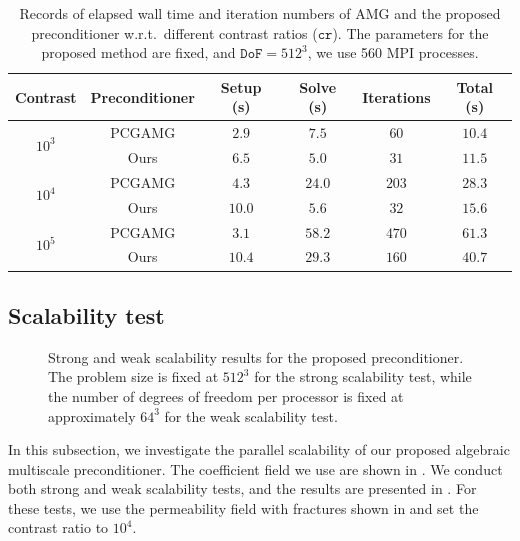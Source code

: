 \documentclass[preprint,12pt]{elsarticle}
\begin{document}
  \begin{table}
    [!ht] \footnotesize
    \caption{Records of elapsed wall time and iteration numbers of AMG and the
    proposed preconditioner w.r.t.\ different contrast ratios ($\mathtt{cr}$).
    The parameters for the proposed method are fixed, and $\mathtt{DoF}=512^{3}$,
    we use 560 MPI processes.}
    \label{tab:comparison_contrast_512}
    \begin{center}
      \makegapedcells
      \begin{tabular}{c c c c c c}
        \toprule Contrast                  & Preconditioner & Setup (s) & Solve (s) & Iterations & Total (s) \\
        \midrule \multirow{2}{*}{$10^{3}$} & PCGAMG         & $2.9$     & $7.5$     & $60$       & $10.4$    \\
                                           & Ours           & $6.5$     & $5.0$     & $31$       & $11.5$    \\
        \midrule \multirow{2}{*}{$10^{4}$} & PCGAMG         & $4.3$     & $24.0$    & $203$      & $28.3$    \\
                                           & Ours           & $10.0$    & $5.6$     & $32$       & $15.6$    \\
        \midrule \multirow{2}{*}{$10^{5}$} & PCGAMG         & $3.1$     & $58.2$    & $470$      & $61.3$    \\
                                           & Ours           & $10.4$    & $29.3$    & $160$      & $40.7$    \\
        \bottomrule
      \end{tabular}
    \end{center}
  \end{table}

  \subsection{Scalability test}
  \begin{figure}[!ht]
    \centering
    \resizebox{\textwidth}{!}{}
    \caption{Strong and weak scalability results for the proposed preconditioner.
    The problem size is fixed at $512^{3}$ for the strong scalability test,
    while the number of degrees of freedom per processor is fixed at
    approximately $64^{3}$ for the weak scalability test.}
    \label{fig:scalability}
  \end{figure}

  In this subsection, we investigate the parallel scalability of our proposed
  algebraic multiscale preconditioner. The coefficient field we use are shown in
  . We conduct both strong and weak scalability tests, and
  the results are presented in . For these tests, we use the
  permeability field with fractures shown in  and set the
  contrast ratio to $10^{4}$.
\end{document}
